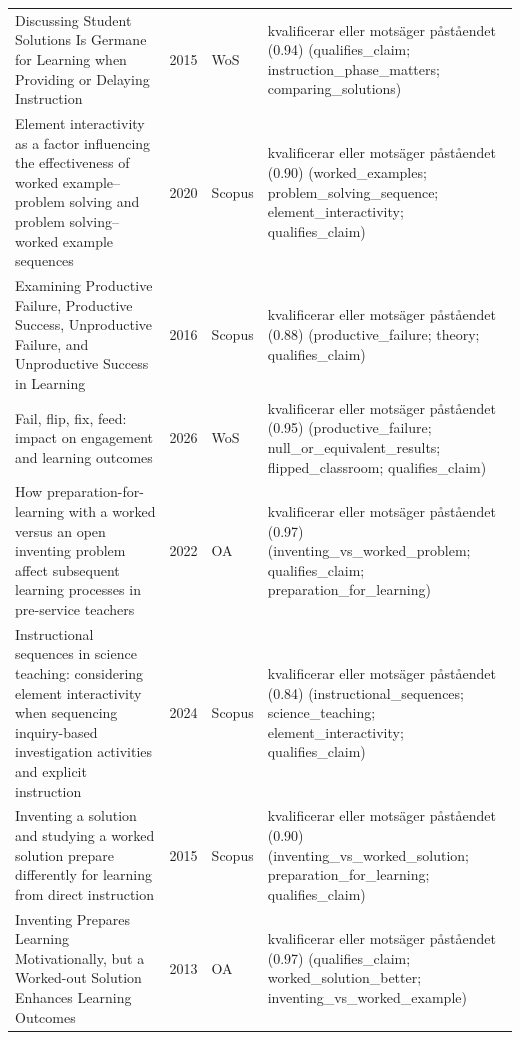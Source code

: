 \begin{longtable}{@{}%
  >{\raggedright\arraybackslash}p{}c%
  >{\raggedright\arraybackslash}p{}%
  >{\raggedright\arraybackslash\footnotesize}p{}@{}}
Discussing Student Solutions Is Germane for Learning when Providing or Delaying Instruction & 2015 & WoS & kvalificerar eller motsäger påståendet (0.94) (qualifies\_\allowbreak{}claim; instruction\_\allowbreak{}phase\_\allowbreak{}matters; comparing\_\allowbreak{}solutions) \\
Element interactivity as a factor influencing the effectiveness of worked example--problem solving and problem solving--worked example sequences & 2020 & Scopus & kvalificerar eller motsäger påståendet (0.90) (worked\_\allowbreak{}examples; problem\_\allowbreak{}solving\_\allowbreak{}sequence; element\_\allowbreak{}interactivity; qualifies\_\allowbreak{}claim) \\
Examining Productive Failure, Productive Success, Unproductive Failure, and Unproductive Success in Learning & 2016 & Scopus & kvalificerar eller motsäger påståendet (0.88) (productive\_\allowbreak{}failure; theory; qualifies\_\allowbreak{}claim) \\
Fail, flip, fix, feed: impact on engagement and learning outcomes & 2026 & WoS & kvalificerar eller motsäger påståendet (0.95) (productive\_\allowbreak{}failure; null\_\allowbreak{}or\_\allowbreak{}equivalent\_\allowbreak{}results; flipped\_\allowbreak{}classroom; qualifies\_\allowbreak{}claim) \\
How preparation-for-learning with a worked versus an open inventing problem affect subsequent learning processes in pre-service teachers & 2022 & OA & kvalificerar eller motsäger påståendet (0.97) (inventing\_\allowbreak{}vs\_\allowbreak{}worked\_\allowbreak{}problem; qualifies\_\allowbreak{}claim; preparation\_\allowbreak{}for\_\allowbreak{}learning) \\
Instructional sequences in science teaching: considering element interactivity when sequencing inquiry-based investigation activities and explicit instruction & 2024 & Scopus & kvalificerar eller motsäger påståendet (0.84) (instructional\_\allowbreak{}sequences; science\_\allowbreak{}teaching; element\_\allowbreak{}interactivity; qualifies\_\allowbreak{}claim) \\
Inventing a solution and studying a worked solution prepare differently for learning from direct instruction & 2015 & Scopus & kvalificerar eller motsäger påståendet (0.90) (inventing\_\allowbreak{}vs\_\allowbreak{}worked\_\allowbreak{}solution; preparation\_\allowbreak{}for\_\allowbreak{}learning; qualifies\_\allowbreak{}claim) \\
Inventing Prepares Learning Motivationally, but a Worked-out Solution Enhances Learning Outcomes & 2013 & OA & kvalificerar eller motsäger påståendet (0.97) (qualifies\_\allowbreak{}claim; worked\_\allowbreak{}solution\_\allowbreak{}better; inventing\_\allowbreak{}vs\_\allowbreak{}worked\_\allowbreak{}example) \\

\end{longtable}
